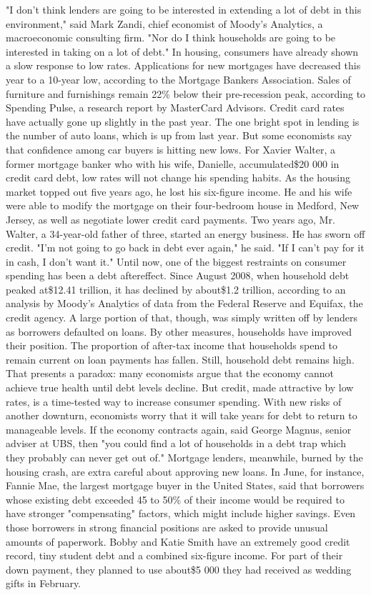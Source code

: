 \documentclass[UTF8,11pt]{ctexart}
\begin{document}
"I don't think lenders are going to be interested in extending a lot of debt in this environment," said Mark Zandi, chief economist of Moody's Analytics, a macroeconomic consulting firm. "Nor do I think households are going to be interested in taking on a lot of debt." In housing, consumers have already shown a slow response to low rates. Applications for new mortgages have decreased this year to a 10-year low, according to the Mortgage Bankers Association. Sales of furniture and furnishings remain 22\% below their pre-recession peak, according to Spending Pulse, a research report by MasterCard Advisors. Credit card rates have actually gone up slightly in the past year. The one bright spot in lending is the number of auto loans, which is up from last year. But some economists say that confidence among car buyers is hitting new lows. For Xavier Walter, a former mortgage banker who with his wife, Danielle, accumulated\$20 000 in credit card debt, low rates will not change his spending habits. As the housing market topped out five years ago, he lost his six-figure income. He and his wife were able to modify the mortgage on their four-bedroom house in Medford, New Jersey, as well as negotiate lower credit card payments. Two years ago, Mr. Walter, a 34-year-old father of three, started an energy business. He has sworn off credit. "I'm not going to go back in debt ever again," he said. "If I can't pay for it in cash, I don't want it." Until now, one of the biggest restraints on consumer spending has been a debt aftereffect. Since August 2008, when household debt peaked at\$12.41 trillion, it has declined by about\$1.2 trillion, according to an analysis by Moody's Analytics of data from the Federal Reserve and Equifax, the credit agency. A large portion of that, though, was simply written off by lenders as borrowers defaulted on loans. By other measures, households have improved their position. The proportion of after-tax income that households spend to remain current on loan payments has fallen. Still, household debt remains high. That presents a paradox: many economists argue that the economy cannot achieve true health until debt levels decline. But credit, made attractive by low rates, is a time-tested way to increase consumer spending. With new risks of another downturn, economists worry that it will take years for debt to return to manageable levels. If the economy contracts again, said George Magnus, senior adviser at UBS, then "you could find a lot of households in a debt trap which they probably can never get out of." Mortgage lenders, meanwhile, burned by the housing crash, are extra careful about approving new loans. In June, for instance, Fannie Mae, the largest mortgage buyer in the United States, said that borrowers whose existing debt exceeded 45 to 50\% of their income would be required to have stronger "compensating" factors, which might include higher savings. Even those borrowers in strong financial positions are asked to provide unusual amounts of paperwork. Bobby and Katie Smith have an extremely good credit record, tiny student debt and a combined six-figure income. For part of their down payment, they planned to use about\$5 000 they had received as wedding gifts in February.
\end{document}
